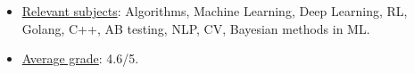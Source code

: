\begin{itemize}
    \item \underline{Relevant subjects}: Algorithms, Machine Learning, Deep Learning, RL, Golang, C++, AB testing, NLP, CV, Bayesian methods in ML.
    \item \underline{Average grade}: 4.6/5.
\end{itemize}
